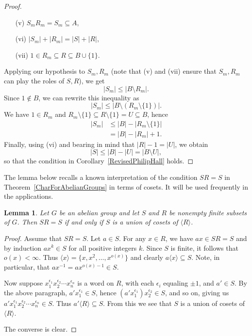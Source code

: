 \documentclass[11pt]{amsart}
\newtheorem{lemma}[theorem]{Lemma}
\theoremstyle{definition}
\theoremstyle{remark}
\begin{document}
\begin{proof}
\begin{itemize}
\item[(v)] \( S_mR_m = S_m \subseteq A \),
\item[(vi)] \( |S_m| + |R_m| = |S| + |R| \),
\item[(vii)] \( 1 \in R_m \subseteq R \subseteq B \cup \{ 1 \}\).
\end{itemize}
Applying our hypothesis to \( S_m, R_m \) (note that (v) and (vii) ensure that \( S_m , R_m \) can play the roles of \( S , R \)), we get
\[ |S_m| \leq |B \setminus R_m|.\]
Since \( 1 \notin B \), we can rewrite this inequality as 
\[ |S_m| \leq |B \setminus (R_m \setminus \{ 1 \})|.\]
We have \( 1 \in R_m \) and \( R_m \setminus \{ 1 \} \subseteq R \setminus \{ 1 \} = U \subseteq B\), hence 
\begin{align*}
|S_m| &\leq |B| - |R_m \setminus \{ 1 \}| \\
& = |B| - |R_m| + 1.
\end{align*}
Finally, using (vi) and bearing in mind that \( |R| - 1 = |U| \), we obtain
\[ |S| \leq |B| - |U| = |B \setminus U|, \] 
so that the condition in Corollary~\ref{RevisedPhilipHall} holds.
\end{proof} 


The lemma below recalls a known interpretation of the condition \( SR = S \) in Theorem~\ref{CharForAbelianGroups} in terms of cosets. It will be used frequently in the applications.


\begin{lemma} \label{UnionOfCosets}
Let \( G \) be an abelian group and let \( S \) and \( R \) be nonempty finite subsets of \( G \). Then \( SR = S \) if and only if \( S \) is a union of cosets of \( \langle R \rangle \). 
\end{lemma}

\begin{proof}
Assume that \( SR = S \).  Let \( a \in S \).  For any \( x \in R \), we have \( ax \in SR = S \) and by induction  \( ax^k \in S \) for all positive integers \( k \). Since \( S \) is finite, it follows that \( o(x) < \infty \).  Thus \( \langle x \rangle = \{ x, x^2, \ldots ,x^{o(x)} \} \) and clearly \( a \langle x \rangle \subseteq S \).  Note, in particular, that \( a x^{-1} = a x^{o(x)-1} \in S \).

Now suppose \( x_1^{\epsilon_1}x_2^{\epsilon_2} \cdots x_n^{\epsilon_n} \) is a word on \( R \), with each \( \epsilon_i \) equaling \( \pm 1 \), and \( a' \in S \).  By the above paragraph, \( a'x_1^{\epsilon_1} \in S \), hence \( (a'x_1^{\epsilon_1})x_2^{\epsilon_2} \in S \), and so on, giving us \( a'x_1^{\epsilon_1}x_2^{\epsilon_2} \cdots x_n^{\epsilon_n} \in S \). Thus \( a' \langle R \rangle \subseteq S \).  From this we see that \( S \) is a union of cosets of \( \langle R \rangle \).

The converse is clear.
\end{proof}
\end{document}

